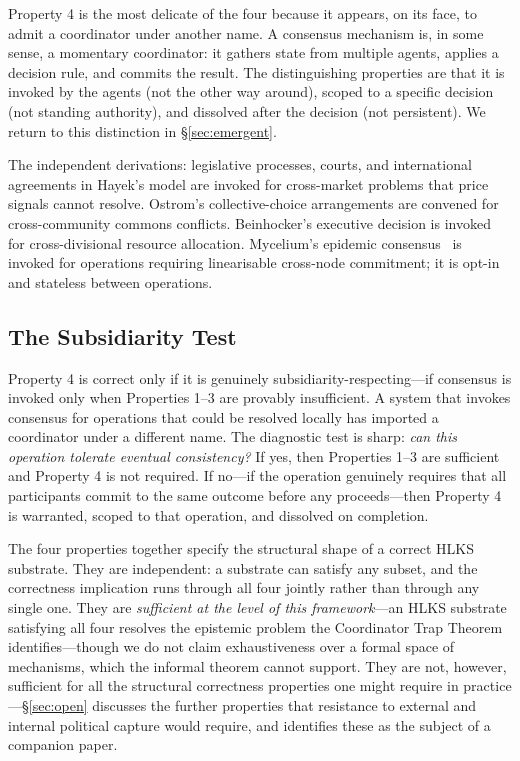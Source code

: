 \documentclass[11pt]{article}
\theoremstyle{definition}
\theoremstyle{plain}
\theoremstyle{plain}
\begin{document}
Property 4 is the most delicate of the four because it appears, on its face,
to admit a coordinator under another name. A consensus mechanism is, in some
sense, a momentary coordinator: it gathers state from multiple agents, applies
a decision rule, and commits the result. The distinguishing properties are
that it is invoked by the agents (not the other way around), scoped to a
specific decision (not standing authority), and dissolved after the decision
(not persistent). We return to this distinction in \S\ref{sec:emergent}.

The independent derivations: legislative processes, courts, and international
agreements in Hayek's model are invoked for cross-market problems that price
signals cannot resolve. Ostrom's collective-choice arrangements are convened
for cross-community commons conflicts. Beinhocker's executive decision is
invoked for cross-divisional resource allocation. Mycelium's epidemic
consensus~\cite{nicholson2026} is invoked for operations requiring
linearisable cross-node commitment; it is opt-in and stateless between
operations.

\subsection{The Subsidiarity Test}

Property 4 is correct only if it is genuinely subsidiarity-respecting---if
consensus is invoked only when Properties 1--3 are provably insufficient. A
system that invokes consensus for operations that could be resolved locally
has imported a coordinator under a different name. The diagnostic test is
sharp: \emph{can this operation tolerate eventual consistency?} If yes, then
Properties 1--3 are sufficient and Property 4 is not required. If no---if the
operation genuinely requires that all participants commit to the same outcome
before any proceeds---then Property 4 is warranted, scoped to that operation,
and dissolved on completion.

The four properties together specify the structural shape of a correct HLKS
substrate. They are independent: a substrate can satisfy any subset, and the
correctness implication runs through all four jointly rather than through any
single one. They are \emph{sufficient at the level of this framework}---an HLKS
substrate satisfying all four resolves the epistemic problem the Coordinator Trap
Theorem identifies---though we do not claim exhaustiveness over a formal space of
mechanisms, which the informal theorem cannot support. They are not, however, sufficient for all the structural
correctness properties one might require in practice---\S\ref{sec:open}
discusses the further properties that resistance to external and internal
political capture would require, and identifies these as the subject of a
companion paper.
\end{document}
